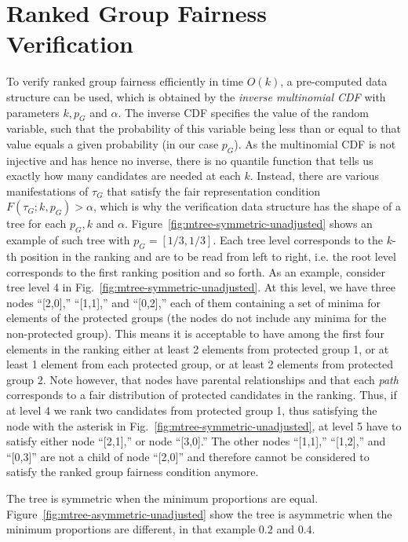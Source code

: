 
\section{Ranked Group Fairness Verification}
\label{sec:fairness-verification}

To verify ranked group fairness efficiently in time $O(k)$, a pre-computed data structure can be used, which is obtained by the \emph{inverse multinomial CDF} with parameters $k, p_G$ and $ \alpha $.
%
The inverse CDF specifies the value of the random variable, such that the probability of this variable being less than or equal to that value equals a given probability (in our case $p_G$).
%
As the multinomial CDF is not injective and has hence no inverse, there is no quantile function that tells us exactly how many candidates are needed at each $ k $.
%
Instead, there are various manifestations of $ \tau_G $ that satisfy the fair representation condition $F(\tau_G;k,p_G) > \alpha$, which is why the verification data structure has the shape of a tree for each $ p_G, k $ and $ \alpha $.
%
Figure~\ref{fig:mtree-symmetric-unadjusted} shows an example of such tree with $p_G = [1/3, 1/3]$. 
%
Each tree level corresponds to the $k$-th position in the ranking and are to be read from left to right, i.e. the root level corresponds to the first ranking position and so forth.
%
As an example, consider tree level 4 in Fig.~\ref{fig:mtree-symmetric-unadjusted}.
%
At this level, we have three nodes ``[2,0],'' ``[1,1],'' and ``[0,2],'' each of them containing a set of minima for elements of the protected groups (the nodes do not include any minima for the non-protected group).
%
This means it is acceptable to have among the first four elements in the ranking either at least 2 elements from protected group 1, or at least 1 element from each protected group, or at least 2 elements from protected group 2.
%
Note however, that nodes have parental relationships and that each \emph{path} corresponds to a fair distribution of protected candidates in the ranking.
%
Thus, if at level 4 we rank two candidates from protected group 1, thus satisfying the node with the asterisk in Fig.~\ref{fig:mtree-symmetric-unadjusted}, at level 5 have to satisfy either node ``[2,1],'' or node ``[3,0].''
%
The other nodes ``[1,1],'' ``[1,2],'' and ``[0,3]'' are not a child of node ``[2,0]'' and therefore cannot be considered to satisfy the ranked group fairness condition anymore.

The tree is symmetric when the minimum proportions are equal. 
%
Figure~\ref{fig:mtree-asymmetric-unadjusted} show the tree is asymmetric when the minimum proportions are different, in that example $0.2$ and $0.4$.

